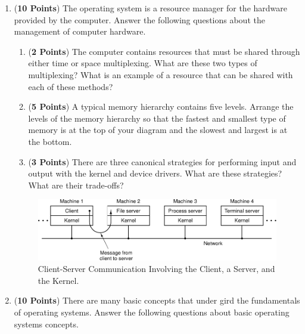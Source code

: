 \documentclass[12pt,epsf,psfig,graphics]{article}
\begin{document}
\begin{enumerate}
  
\item ({\bf 10 Points}) The operating system is a resource manager for the hardware provided by the computer.  Answer
  the following questions about the management of computer hardware.

  \begin{enumerate}
          
  \item ({\bf 2 Points}) The computer contains resources that must be shared through either time or space multiplexing.
    What are these two types of multiplexing? What is an example of a resource that can be shared with each of these
    methods?
   
  \item ({\bf 5 Points}) A typical memory hierarchy contains five levels.  Arrange the levels of the memory hierarchy so
    that the fastest and smallest type of memory is at the top of your diagram and the slowest and largest is at the
    bottom.
  
  \item ({\bf 3 Points}) There are three canonical strategies for performing input and output with the
    kernel and device drivers.  What are these strategies? What are their trade-offs?

  \end{enumerate}
        
\newpage

\begin{figure}[t]
  \centering
  \includegraphics{fig1-27}
  \caption{Client-Server Communication Involving the Client, a Server, and the Kernel.}
  \label{fig:clientserver}
\end{figure}

\item ({\bf 10 Points}) There are many basic concepts that under gird the fundamentals of operating systems.  Answer the
  following questions about basic operating systems concepts.

  \begin{enumerate}
          

\end{enumerate}
\end{enumerate}
\end{document}
